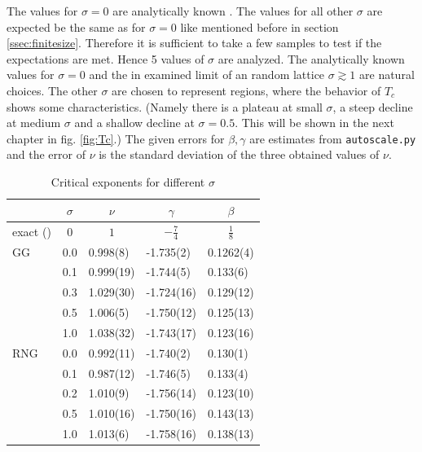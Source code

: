     The values for
    \(\sigma = 0\) are analytically known \cite{Pelissetto2002}. The
    values for all other \(\sigma\) are expected be the same as for
    \(\sigma = 0\) like mentioned before in section \ref{ssec:finitesize}.
    Therefore it is sufficient to take a few samples to test if the
    expectations are met. Hence 5 values of \(\sigma\) are analyzed.
    The analytically known values for \(\sigma = 0\) and the in \cite{Janke1994}
    examined limit of an random lattice \(\sigma \gtrsim 1\) are natural
    choices.
    The other \(\sigma\) are chosen to represent regions, where the behavior of
    \(T_c\) shows some characteristics. (Namely there is a plateau at small
    \(\sigma\), a steep decline at medium \(\sigma\) and a shallow
    decline at \(\sigma = 0.5\). This will be shown in the next
    chapter in fig. \ref{fig:Tc}.)
    The given errors for \(\beta, \gamma\) are estimates from \texttt{autoscale.py}
    and the error of \(\nu\) is the standard deviation of the three obtained
    values of \(\nu\).\\
    \begin{table}[htbp]
        \center
        \begin{tabular}{l l l l l}
            \toprule
             & \multicolumn{1}{c}{\(\sigma\)} & \multicolumn{1}{c}{\(\nu\)} & \multicolumn{1}{c}{\(\gamma\)} & \multicolumn{1}{c}{\(\beta\)}\\
            \midrule
            exact (\cite[p. 59]{Pelissetto2002}) & \multicolumn{1}{c}{\(0\)} & \multicolumn{1}{c}{\(1\)} & \multicolumn{1}{c}{\(-\frac{7}{4}\)} & \multicolumn{1}{c}{\(\frac{1}{8}\)}\\
            \midrule
            GG           & 0.0 & 0.998(8) & -1.735(2) & 0.1262(4)\\
                         & 0.1 & 0.999(19)& -1.744(5) & 0.133(6) \\
                         & 0.3 & 1.029(30)& -1.724(16)& 0.129(12)\\
                         & 0.5 & 1.006(5) & -1.750(12)& 0.125(13)\\
                         & 1.0 & 1.038(32)& -1.743(17)& 0.123(16)\\
            \midrule
            RNG          & 0.0 & 0.992(11)& -1.740(2) & 0.130(1) \\
                         & 0.1 & 0.987(12)& -1.746(5) & 0.133(4) \\
                         & 0.2 & 1.010(9) & -1.756(14)& 0.123(10)\\
                         & 0.5 & 1.010(16)& -1.750(16)& 0.143(13)\\
                         & 1.0 & 1.013(6) & -1.758(16)& 0.138(13)\\
            \bottomrule
        \end{tabular}
        \caption{Critical exponents for different $\sigma$}
        \label{tab:critExp}
    \end{table}\\
